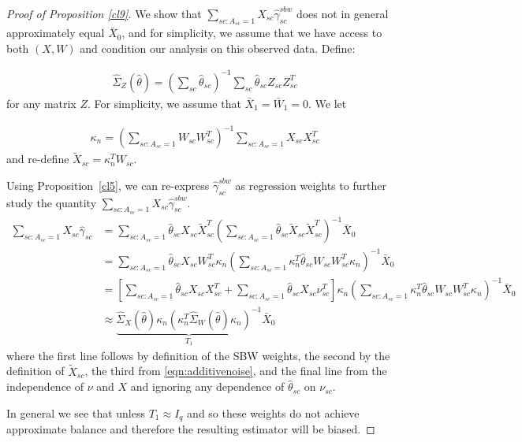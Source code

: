 \begin{proof}[Proof of Proposition \ref{cl9}]
    We show that $\sum_{sc: A_{sc} = 1}X_{sc}\hat{\gamma}^{sbw}_{sc}$ does not in general approximately equal $\bar{X}_0$, and for simplicity, we assume that we have access to both $(X, W)$ and condition our analysis on this observed data. Define:
    
    \begin{align*}
    \hat{\Sigma}_Z(\hat{\theta}) = (\sum_{sc} \hat{\theta}_{sc})^{-1}\sum_{sc}\hat{\theta}_{sc}Z_{sc}Z_{sc}^T
    \end{align*} 
    for any matrix $Z$. For simplicity, we assume that $\bar{X}_1 = \bar{W}_1 = 0$. We let 
    
    \begin{align*}
    \kappa_n = (\sum_{sc: A_{sc} = 1} W_{sc}W_{sc}^T)^{-1} \sum_{sc: A_{sc} = 1} X_{sc}X_{sc}^T
    \end{align*}
    and re-define $\tilde{X}_{sc} = \kappa_n^TW_{sc}$. 
    
    Using Proposition~\ref{cl5}, we can re-express $\hat{\gamma}^{sbw}_{sc}$ as regression weights to further study the quantity $\sum_{sc: A_{sc} = 1}X_{sc}\hat{\gamma}^{sbw}_{sc}$. 
    \begin{align}
        \nonumber\sum_{sc: A_{sc} = 1}X_{sc}\hat{\gamma}_{sc} &= \sum_{sc: A_{sc} = 1} \hat{\theta}_{sc}X_{sc}\tilde{X}_{sc}^T(\sum_{sc: A_{sc} = 1} \hat{\theta}_{sc}\tilde{X}_{sc}\tilde{X}_{sc}^T)^{-1}\bar{X}_0 \\
        \nonumber&= \sum_{sc: A_{sc} = 1} \hat{\theta}_{sc}X_{sc}W_{sc}^T\kappa_n(\sum_{sc: A_{sc} = 1} \kappa_n^T\hat{\theta}_{sc}W_{sc}W_{sc}^T\kappa_n)^{-1}\bar{X}_0\label{prop1a} \\
        \nonumber&= [\sum_{sc: A_{sc} = 1} \hat{\theta}_{sc}X_{sc}X_{sc}^T + \sum_{sc: A_{sc} = 1} \hat{\theta}_{sc}X_{sc}\nu_{sc}^T]\kappa_n(\sum_{sc: A_{sc} = 1} \kappa_n^T\hat{\theta}_{sc}W_{sc}W_{sc}^T\kappa_n)^{-1}\bar{X}_0\label{prop1a} \\
        \nonumber&\approx \underbrace{\hat{\Sigma}_X(\hat{\theta})\kappa_n(\kappa_n^T\hat{\Sigma}_W(\hat{\theta})\kappa_n)^{-1}}_{T_1}\bar{X}_0 \label{prop1d}
        \end{align}
    where the first line follows by definition of the SBW weights, the second by the definition of $\tilde{X}_{sc}$, the third from \eqref{eqn:additivenoise}, and the final line from the independence of $\nu$ and $X$ and ignoring any dependence of $\hat{\theta}_{sc}$ on $\nu_{sc}$.
    
    In general we see that unless $T_1 \approx I_q$ and so these weights do not achieve approximate balance and therefore the resulting estimator will be biased.
\end{proof}


